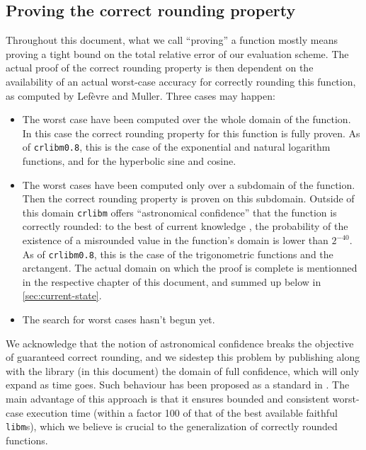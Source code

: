 \subsection{Proving the correct rounding property}

Throughout this document, what we call ``proving'' a function mostly
means proving a tight bound on the total relative error of our
evaluation scheme. The actual proof of the correct rounding property
is then dependent on the availability of an actual worst-case accuracy
for correctly rounding this function, as computed by Lef\`evre and
Muller. Three cases may happen:
\begin{itemize}
\item The worst case have been computed over the whole domain of the
  function. In this case the correct rounding property for this
  function is fully proven. As of \texttt{crlibm0.8}, this is the case
  of the exponential and natural logarithm functions, and for the
  hyperbolic sine and cosine.

\item The worst cases have been computed only over a subdomain of the
  function. Then the correct rounding property is proven on this
  subdomain. Outside of this domain \texttt{crlibm} offers
  ``astronomical confidence'' that the function is correctly rounded:
  to the best of current knowledge \cite{Gal86, DinGast2005}, the
  probability of the existence of a misrounded value in the function's
  domain is lower than $2^{-40}$. As of \texttt{crlibm0.8}, this is
  the case of the trigonometric functions and the arctangent. The
  actual domain on which the proof is complete is mentionned in the
  respective chapter of this document, and summed up below in \ref{sec:current-state}.
\item The search for worst cases hasn't begun yet.
\end{itemize}

We acknowledge that the notion of astronomical confidence breaks the
objective of guaranteed correct rounding, and we sidestep this problem
by publishing along with the library (in this document) the domain of
full confidence, which will only expand as time goes.  Such behaviour
has been proposed as a standard in \cite{DefHanLefMulRevZim2004}.  The
main advantage of this approach is that it ensures bounded and
consistent worst-case execution time (within a factor 100 of that of
the best available faithful \texttt{libm}s), which we believe is
crucial to the generalization of correctly rounded functions.


